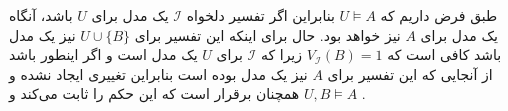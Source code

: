 \documentclass[]{exam}
\begin{document}
طبق فرض داریم که $U \models A$
بنابراین اگر تفسیر دلخواه $\mathscr{I}$ یک مدل برای $U$ باشد،
آنگاه یک مدل برای $A$ نیز خواهد بود.
حال برای اینکه این تفسیر برای $U \cup \lbrace B \rbrace$ نیز یک مدل باشد کافی است که
$V_{\mathscr{I}}(B) = 1$ زیرا که $\mathscr{I}$ برای $U$ یک مدل است
و اگر اینطور باشد از آنجایی که این تفسیر برای $A$ نیز یک مدل بوده است بنابراین تغییری ایجاد نشده
و همچنان برقرار است که این حکم را ثابت می‌کند 
و $U,B \models A$ .
\end{document}
